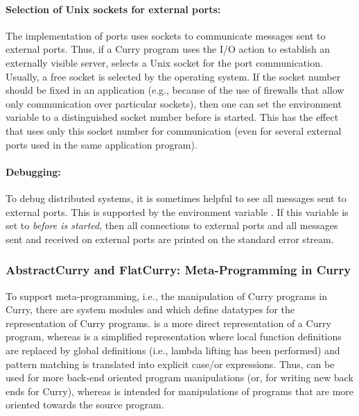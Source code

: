 {\paragraph{Selection of Unix sockets for external ports:}
The implementation of ports uses sockets to communicate
messages sent to external ports.
Thus, if a Curry program uses the
I/O action 
to establish an externally visible server,
\CYS selects a Unix socket for the port communication.
Usually, a free socket is selected by the operating system.
If the socket number should be fixed in an application (e.g.,
because of the use of firewalls that allow only
communication over particular sockets), then one
can set the environment variable 
to a distinguished socket number before \CYS is started.
This has the effect that \CYS uses only this socket
number for communication (even for several external ports
used in the same application program).

\paragraph{Debugging:}
To debug distributed systems,
it is sometimes helpful to see all messages sent to external ports.
This is supported by the environment variable
.
If this variable is set to 
\emph{before \CYS is started}, then all
connections to external ports and all
messages sent and received on external ports are
printed on the standard error stream.


\subsubsection{AbstractCurry and FlatCurry: Meta-Programming in Curry}
\label{sec-flatcurry}

To support meta-programming, i.e., the manipulation of Curry programs
in Curry, there are system modules 
and  %
which define datatypes for the representation
of Curry programs.
 is a more direct representation of a Curry program,
whereas  is a simplified representation
where local function definitions are replaced by global definitions
(i.e., lambda lifting has been performed) and pattern matching
is translated into explicit case/or expressions.
Thus,  can be used for more back-end oriented
program manipulations (or, for writing new back ends for Curry),
whereas  is intended for manipulations of
programs that are more oriented towards the source program.

}
